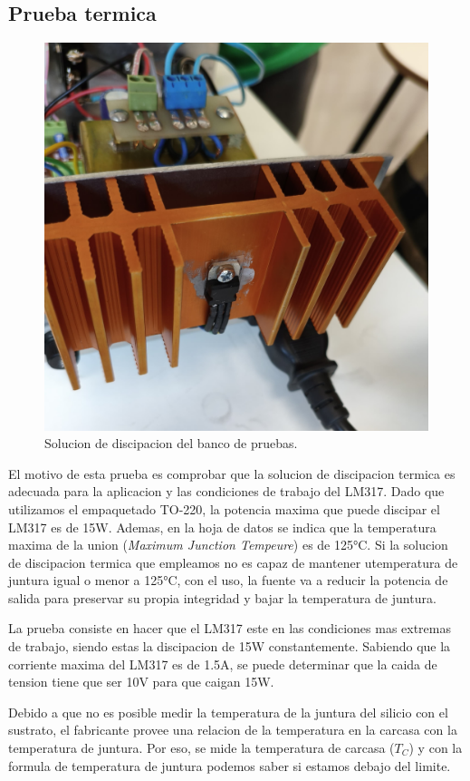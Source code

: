 \documentclass[chaptersright]{informeutn}
\begin{document}
      \subsection{Prueba termica}
        \begin{figure}
          \centering
          \includegraphics[width=.4\textwidth]{pictures/reg_discipador.jpeg}
          \caption{Solucion de discipacion del banco de pruebas.}
        \end{figure}
        El motivo de esta prueba es comprobar que la solucion de discipacion termica es adecuada para la aplicacion y
        las condiciones de trabajo del LM317. Dado que utilizamos el empaquetado TO-220, la potencia maxima que puede
        discipar el LM317 es de 15W. Ademas, en la hoja de datos se indica que la temperatura maxima de la union
        (\textit{Maximum Junction Tempeure}) es de 125°C. Si la solucion de discipacion termica que empleamos no
        es capaz de mantener utemperatura de juntura igual o menor a 125°C, con el uso, la fuente va a reducir la
        potencia de salida para preservar su propia integridad y bajar la temperatura de juntura.

        La prueba consiste en hacer que el LM317 este en las condiciones mas extremas de trabajo, siendo estas la
        discipacion de 15W constantemente. Sabiendo que la corriente maxima del LM317 es de 1.5A, se puede determinar
        que la caida de tension tiene que ser 10V para que caigan 15W.

        Debido a que no es posible medir la temperatura de la juntura del silicio con el sustrato, el fabricante
        provee una relacion de la temperatura en la carcasa con la temperatura de juntura. Por eso, se mide la
        temperatura de carcasa ($T_C$) y con la formula de temperatura de juntura podemos saber si estamos
        debajo del limite.
\end{document}
